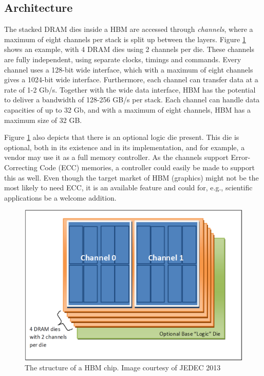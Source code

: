 \subsection{Architecture}
The stacked DRAM dies inside a HBM are accessed through \emph{channels}, where a maximum of eight channels per stack is split up between the layers. Figure \ref{HBM-structure} shows an example, with 4 DRAM dies using 2 channels per die. These channels are fully independent, using separate clocks, timings and commands. Every channel uses a 128-bit wide interface, which with a maximum of eight channels gives a 1024-bit wide interface. Furthermore, each channel can transfer data at a rate of 1-2 Gb/s. Together with the wide data interface, HBM has the potential to deliver a bandwidth of 128-256 GB/s per stack. Each channel can handle data capacities of up to 32 Gb, and with a maximum of eight channels, HBM has a maximum size of 32 GB. 
\bigskip

Figure \ref{HBM-structure} also depicts that there is an optional logic die present. This die is optional, both in its existence and in its implementation, and for example, a vendor may use it as a full memory controller. As the channels support Error-Correcting Code (ECC) memories, a controller could easily be made to support this as well. Even though the target market of HBM (graphics) might not be the most likely to need ECC, it is an available feature and could for, e.g., scientific applications be a welcome addition. 

\begin{figure}[!h]
\centering
\includegraphics[width=0.75\linewidth]{figure/HBM_structure.PNG}
\caption{The structure of a HBM chip. Image courtesy of JEDEC 2013 }
\label{HBM-structure}
\end{figure}

